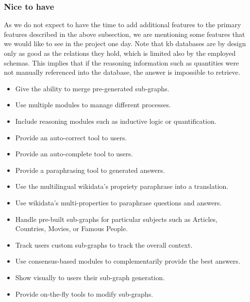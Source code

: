 \subsubsection{Nice to have}
As we do not expect to have the time to add additional features to the primary features described in the above subsection, we are mentioning some features that we would like to see in the project one day. Note that \gls{kb} databases are by design only as good as the relations they hold, which is limited also by the employed schemas. This implies that if the reasoning information such as quantities were not manually referenced into the database, the answer is impossible to retrieve.

\begin{itemize}
    \setlength\itemsep{0em}
    \item Give the ability to merge pre-generated sub-graphs.
    \item Use multiple modules to manage different processes.
    \item Include reasoning modules such as inductive logic or quantification.
    \item Provide an auto-correct tool to users.
    \item Provide an auto-complete tool to users.
    \item Provide a paraphrasing tool to generated answers.
    \item Use the multilingual \gls{wikidata}'s propriety paraphrase into a translation.
    \item Use \gls{wikidata}'s multi-properties to paraphrase questions and answers.
    \item Handle pre-built sub-graphs for particular subjects such as Articles, Countries, Movies, or Famous People.
    \item Track users custom sub-graphs to track the overall context.
    \item Use consensus-based modules to complementarily provide the best answers.
    \item Show visually to users their sub-graph generation.
    \item Provide on-the-fly tools to modify sub-graphs.
\end{itemize}



